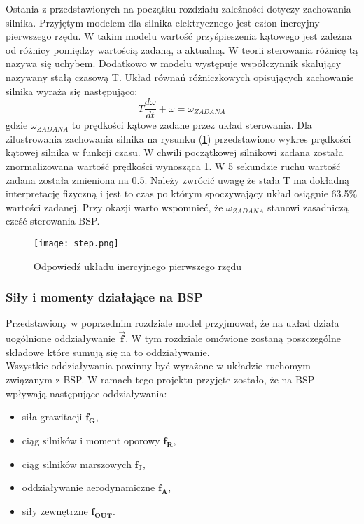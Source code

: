 Ostania z przedstawionych na początku rozdziału zależności dotyczy zachowania silnika. Przyjętym modelem dla silnika elektrycznego jest człon inercyjny pierwszego rzędu. W takim modelu wartość przyśpieszenia kątowego jest zależna od różnicy pomiędzy wartością zadaną, a aktualną. W teorii sterowania różnicę tą nazywa się uchybem. Dodatkowo w modelu występuje współczynnik skalujący nazywany stałą czasową T. Układ równań różniczkowych opisujących zachowanie silnika wyraża się następująco:
 \[
	T \frac{d\omega}{dt} + \omega = \omega_{ZADANA}
\]
gdzie $\omega_{ZADANA}$ to prędkości kątowe zadane przez układ sterowania. Dla zilustrowania zachowania silnika na rysunku (\ref{rotor_step}) przedstawiono wykres prędkości kątowej silnika w funkcji czasu. W chwili początkowej silnikowi zadana została znormalizowana wartość prędkości wynosząca 1. W 5 sekundzie ruchu wartość zadana została zmieniona na 0.5. Należy zwrócić uwagę że stała T ma dokładną interpretację fizyczną i jest to czas po którym spoczywający układ osiągnie 63.5\% wartości zadanej. Przy okazji warto wspomnieć, że $\omega_{ZADANA}$ stanowi zasadniczą cześć sterowania BSP.

\begin{figure}[!h]
   	\centering
      	\texttt{[image: step.png]}
      	\caption{Odpowiedź układu inercyjnego pierwszego rzędu}
      	\label{rotor_step}
\end{figure}

\subsubsection{Siły i momenty działające na BSP}

Przedstawiony w poprzednim rozdziale model przyjmował, że na układ działa uogólnione oddziaływanie $\bm{\vec{f}}$. W tym rozdziale omówione zostaną poszczególne składowe które sumują się na to oddziaływanie.\\

Wszystkie oddziaływania powinny być wyrażone w układzie ruchomym związanym z BSP. W ramach tego projektu przyjęte zostało, że na BSP wpływają następujące oddziaływania:
\begin{itemize}
  \item {
    siła grawitacji  $\bm{f_G}$,
  }
  \item{   
    ciąg silników i moment oporowy  $\bm{f_R}$,
   }
    \item{   
    ciąg silników marszowych  $\bm{f_J}$,
   }
    \item{   
    oddziaływanie aerodynamiczne $\bm{f_A}$,
   }
    \item{   
   siły zewnętrzne $\bm{f_{OUT}}$.
   }
\end{itemize}

